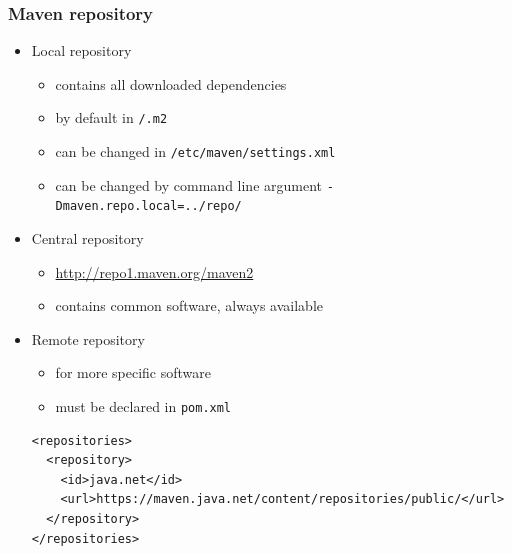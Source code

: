 \documentclass[10pt,xcolor=pdflatex]{beamer}
\begin{document}
\begin{frame}[containsverbatim]\frametitle{Maven repository}
\begin{itemize}
	\item Local repository
	  \begin{itemize}
		\item contains all downloaded dependencies
		\item by default in \texttt{\texttildelow /.m2}
		\item can be changed in \texttt{/etc/maven/settings.xml}
		\item can be changed by command line argument \texttt{-Dmaven.repo.local=../repo/}
	  \end{itemize}
    \item Central repository
	  \begin{itemize}
		\item \url{http://repo1.maven.org/maven2}
		\item contains common software, always available
	  \end{itemize}
    \item Remote repository
	  \begin{itemize}
		\item for more specific software
        \item must be declared in \texttt{pom.xml}
	  \end{itemize}
    \begin{footnotesize}
    \begin{verbatim}
<repositories>
  <repository>
    <id>java.net</id>
    <url>https://maven.java.net/content/repositories/public/</url>
  </repository>
</repositories>
    \end{verbatim}
    \end{footnotesize}
\end{itemize}
\end{frame}
\end{document}
